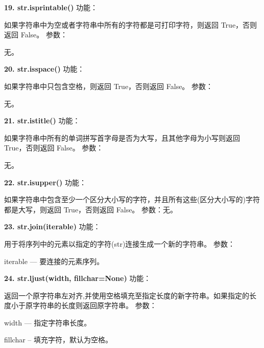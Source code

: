 \documentclass{book}
\begin{document}
\begin{CJK}{UTF8}{gbsn}
\noindent \textbf{19. str.isprintable()} \newline
功能：\par 如果字符串中为空或者字符串中所有的字符都是可打印字符，则返回 True，否则返回 False。\newline
参数：\par 无。
\newline

\noindent \textbf{20. str.isspace()} \newline
功能：\par 如果字符串中只包含空格，则返回 True，否则返回 False。\newline
参数：\par 无。
\newline

\noindent \textbf{21. str.istitle()} \newline
功能：\par 如果字符串中所有的单词拼写首字母是否为大写，且其他字母为小写则返回 True，否则返回 False。\newline
参数：\par 无。
\newline

\noindent \textbf{22. str.isupper()} \newline
功能：\par 如果字符串中包含至少一个区分大小写的字符，并且所有这些(区分大小写的)字符都是大写，则返回 True，否则返回 False。\newline
参数：无。\par 

\noindent \textbf{23. str.join(iterable)} \newline
功能：\par 用于将序列中的元素以指定的字符(str)连接生成一个新的字符串。\newline
参数：\par iterable --- 要连接的元素序列。
\newline

\noindent \textbf{24. str.ljust(width, fillchar=None)} \newline
功能：\par 返回一个原字符串左对齐,并使用空格填充至指定长度的新字符串。如果指定的长度小于原字符串的长度则返回原字符串。\newline
参数：\par width --- 指定字符串长度。
	 \par fillchar -- 填充字符，默认为空格。
\newline


\end{CJK}
\end{document}
